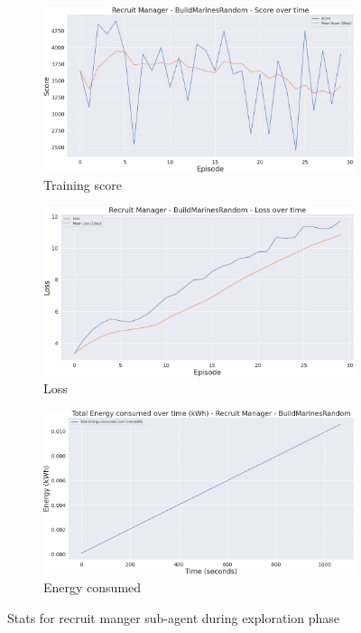 \begin{figure}[h]
    \centering
    \begin{subfigure}[b]{0.495\textwidth}
        \includegraphics[width=1\textwidth]{figs/multi_dqn_army_recruit_manager_exploration/score.png}
        \caption{Training score}
    \end{subfigure}
    \begin{subfigure}[b]{0.495\textwidth}
        \includegraphics[width=1\textwidth]{figs/multi_dqn_army_recruit_manager_exploration/loss.png}
        \caption{Loss}
    \end{subfigure}
    \begin{subfigure}[b]{0.495\textwidth}
        \includegraphics[width=1\textwidth]{figs/multi_dqn_army_recruit_manager_exploration/energy_consumed.png}
        \caption{Energy consumed}
    \end{subfigure}
    \caption{Stats for recruit manger sub-agent during exploration phase}
\end{figure}

